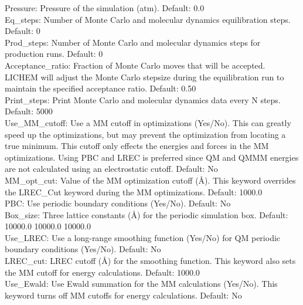 \documentclass[12pt]{report}
\begin{document}
Pressure: Pressure of the simulation (atm).
Default: 0.0 \\

Eq\_steps: Number of Monte Carlo and molecular dynamics equilibration steps.
Default: 0 \\

Prod\_steps: Number of Monte Carlo and molecular dynamics steps for
production runs.
Default: 0 \\

Acceptance\_ratio: Fraction of Monte Carlo moves that will be accepted.
LICHEM will adjust the Monte Carlo stepsize during the equilibration run to
maintain the specified acceptance ratio.
Default: 0.50 \\

Print\_steps: Print Monte Carlo and molecular dynamics data every N steps.
Default: 5000 \\

Use\_MM\_cutoff: Use a MM cutoff in optimizations (Yes/No).
This can greatly speed up the optimizations, but may prevent the optimization
from locating a true minimum.
This cutoff only effects the energies and forces in the MM optimizations.
Using PBC and LREC is preferred since QM and QMMM energies are not calculated
using an electrostatic cutoff.
Default: No \\

MM\_opt\_cut: Value of the MM optimization cutoff (\AA).
This keyword overrides the LREC\_Cut keyword during the MM optimizations.
Default: 1000.0 \\

PBC: Use periodic boundary conditions (Yes/No).
Default: No \\

Box\_size: Three lattice constants (\AA) for the periodic simulation box.
Default: 10000.0 10000.0 10000.0 \\

Use\_LREC: Use a long-range smoothing function (Yes/No) for QM periodic
boundary conditions (Yes/No).
Default: No \\

LREC\_cut: LREC cutoff (\AA) for the smoothing function.
This keyword also sets the MM cutoff for energy calculations.
Default: 1000.0 \\

Use\_Ewald: Use Ewald summation for the MM calculations (Yes/No).
This keyword turns off MM cutoffs for energy calculations.
Default: No \\
\end{document}
